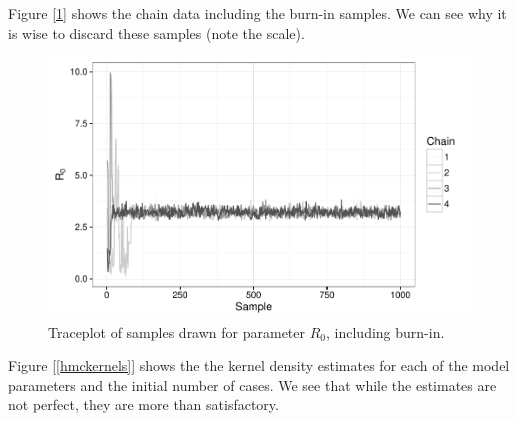 	Figure [\ref{traceplot2}] shows the chain data including the burn-in samples. We can see why it is wise to discard these samples (note the scale).

    \begin{figure}
        \centering
        \captionsetup{width=0.8\linewidth}
        \includegraphics[width=\textwidth]{./images/traceplotR0_inc.pdf}
        \caption{Traceplot of samples drawn for parameter $R_0$, including burn-in. \label{traceplot2}}
    \end{figure}

    Figure [\ref{hmckernels}] shows the the kernel density estimates for each of the model parameters and the initial number of cases. We see that while the estimates are not perfect, they are more than satisfactory.

